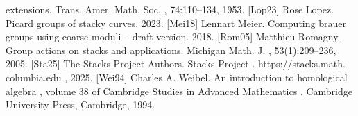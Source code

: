 \documentclass{article}
\begin{document}
extensions. Trans. Amer. Math. Soc. , 74:110–134, 1953. [Lop23] Rose Lopez. Picard groups of stacky curves. 2023. [Mei18] Lennart Meier. Computing brauer groups using coarse moduli – draft version. 2018. [Rom05] Matthieu Romagny. Group actions on stacks and applications. Michigan Math. J. , 53(1):209–236, 2005. [Sta25] The Stacks Project Authors. Stacks Project . https://stacks.math. columbia.edu , 2025. [Wei94] Charles A. Weibel. An introduction to homological algebra , volume 38 of Cambridge Studies in Advanced Mathematics . Cambridge University Press, Cambridge, 1994. 
\end{document}
